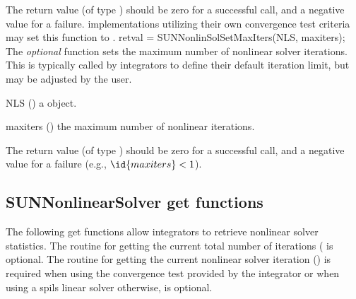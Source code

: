 {
  The return value  (of type ) should be zero for a
  successful call, and a negative value for a failure.
}
{
  {\sunnonlinsol} implementations utilizing their own convergence test
  criteria may set this function to .
}
{
  retval = SUNNonlinSolSetMaxIters(NLS, maxiters);
}
{
  The \textit{optional} function  sets the maximum
  number of nonlinear solver iterations. This is typically called by
  {\sundials} integrators to define their default iteration limit, but may be
  adjusted by the user.
}
{
  \begin{args}[maxiters]
  \item[NLS] ()
    a {\sunnonlinsol} object.
  \item[maxiters] ()
    the maximum number of nonlinear iterations.
  \end{args}
}
{
  The return value  (of type ) should be zero for a
  successful call, and a negative value for a failure
  (e.g., $\id{maxiters} < 1$).
}
{}


\subsection{SUNNonlinearSolver get functions}
\label{ss:sunnonlinsol_getfn}
The following get functions allow {\sundials} integrators to retrieve nonlinear
solver statistics. The routine for getting the current total number of
iterations ( is optional. The routine for getting
the current nonlinear solver iteration () is required
when using the convergence test provided by the {\sundials} integrator or when
using a {\sunlinsol} spils linear solver otherwise,
 is optional.

